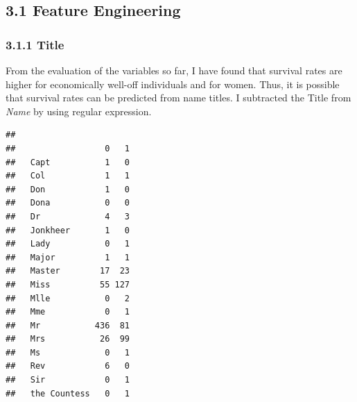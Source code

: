 \documentclass[
]{article}
\newenvironment{Shaded}{\begin{snugshade}}{\end{snugshade}}
\newcommand{\AttributeTok}[1]{\textcolor[rgb]{0.77,0.63,0.00}{#1}}
\newcommand{\ControlFlowTok}[1]{\textcolor[rgb]{0.13,0.29,0.53}{\textbf{#1}}}
\newcommand{\DecValTok}[1]{\textcolor[rgb]{0.00,0.00,0.81}{#1}}
\newcommand{\FunctionTok}[1]{\textcolor[rgb]{0.00,0.00,0.00}{#1}}
\newcommand{\NormalTok}[1]{#1}
\newcommand{\OtherTok}[1]{\textcolor[rgb]{0.56,0.35,0.01}{#1}}
\newcommand{\SpecialCharTok}[1]{\textcolor[rgb]{0.00,0.00,0.00}{#1}}
\newcommand{\StringTok}[1]{\textcolor[rgb]{0.31,0.60,0.02}{#1}}
\begin{document}
\hypertarget{feature-engineering}{%
\subsection{\texorpdfstring{\textbf{3.1 Feature
Engineering}}{3.1 Feature Engineering}}\label{feature-engineering}}

\hypertarget{title}{%
\subsubsection{\texorpdfstring{\textbf{3.1.1
Title}}{3.1.1 Title}}\label{title}}

From the evaluation of the variables so far, I have found that survival
rates are higher for economically well-off individuals and for women.
Thus, it is possible that survival rates can be predicted from name
titles. I subtracted the Title from \emph{Name} by using regular
expression.

\begin{Shaded}
\end{Shaded}

\begin{verbatim}
##               
##                  0   1
##   Capt           1   0
##   Col            1   1
##   Don            1   0
##   Dona           0   0
##   Dr             4   3
##   Jonkheer       1   0
##   Lady           0   1
##   Major          1   1
##   Master        17  23
##   Miss          55 127
##   Mlle           0   2
##   Mme            0   1
##   Mr           436  81
##   Mrs           26  99
##   Ms             0   1
##   Rev            6   0
##   Sir            0   1
##   the Countess   0   1
\end{verbatim}
\end{document}
